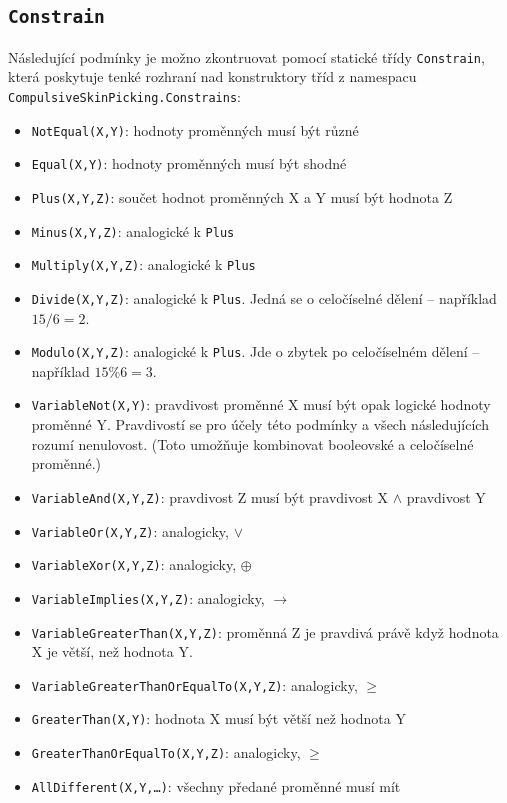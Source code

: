 \documentclass[a4paper]{article}
\begin{document}
\subsection{\texttt{Constrain}}
Následující podmínky je možno zkontruovat pomocí statické třídy \texttt{Constrain},
která poskytuje tenké rozhraní nad konstruktory tříd z namespacu \\
\texttt{CompulsiveSkinPicking.Constrains}:
\begin{itemize}
\item
	\texttt{NotEqual(X,Y)}: hodnoty proměnných musí být různé
\item
	\texttt{Equal(X,Y)}: hodnoty proměnných musí být shodné
\item
	\texttt{Plus(X,Y,Z)}: součet hodnot proměnných X a Y musí být hodnota Z
\item
	\texttt{Minus(X,Y,Z)}: analogické k \texttt{Plus}
\item
	\texttt{Multiply(X,Y,Z)}: analogické k \texttt{Plus}
\item
	\texttt{Divide(X,Y,Z)}: analogické k \texttt{Plus}. Jedná se o
	celočíselné dělení -- například $15 / 6 = 2$.
\item
	\texttt{Modulo(X,Y,Z)}: analogické k \texttt{Plus}. Jde o zbytek po
	celočíselném dělení -- například $15 \% 6 = 3$.
\item
	\texttt{VariableNot(X,Y)}: pravdivost proměnné X musí být opak
	logické hodnoty proměnné Y. Pravdivostí se pro účely této podmínky
	a všech následujících rozumí nenulovost. (Toto umožňuje kombinovat
	booleovské a celočíselné proměnné.)
\item
	\texttt{VariableAnd(X,Y,Z)}: pravdivost Z musí být pravdivost X $\wedge$
	pravdivost Y
\item
	\texttt{VariableOr(X,Y,Z)}: analogicky, $\vee$
\item
	\texttt{VariableXor(X,Y,Z)}: analogicky, $\oplus$
\item
	\texttt{VariableImplies(X,Y,Z)}: analogicky, $\rightarrow$
\item
	\texttt{VariableGreaterThan(X,Y,Z)}: proměnná Z je pravdivá právě když
	hodnota X je větší, než hodnota Y.
\item
	\texttt{VariableGreaterThanOrEqualTo(X,Y,Z)}: analogicky, $\geq$
\item
	\texttt{GreaterThan(X,Y)}: hodnota X musí být větší než hodnota Y
\item
	\texttt{GreaterThanOrEqualTo(X,Y,Z)}: analogicky, $\geq$
\item
	\texttt{AllDifferent(X,Y,\ldots)}: všechny předané proměnné musí mít

\end{itemize}
\end{document}
